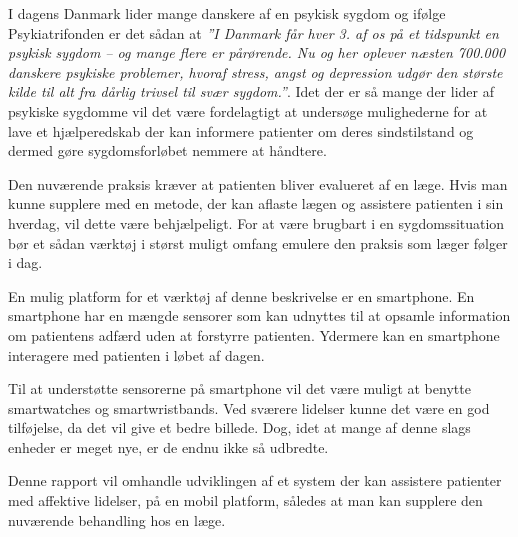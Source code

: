 


I dagens Danmark lider mange danskere af en psykisk sygdom og ifølge Psykiatrifonden er det sådan at \textit{''I Danmark får hver 3. af os på et tidspunkt en psykisk sygdom – og mange flere er pårørende. 
Nu og her oplever næsten 700.000 danskere psykiske problemer, hvoraf stress, angst og depression udgør den største kilde til alt fra dårlig trivsel til svær sygdom.''}\citep{psykiatrifonden}.
Idet der er så mange der lider af psykiske sygdomme vil det være fordelagtigt at undersøge mulighederne for at lave et hjælperedskab der kan informere patienter om deres sindstilstand og dermed gøre sygdomsforløbet nemmere at håndtere.

Den nuværende praksis kræver at patienten bliver evalueret af en læge.
Hvis man kunne supplere med en metode, der kan aflaste lægen og assistere patienten i sin hverdag, vil dette være behjælpeligt. 
For at være brugbart i en sygdomssituation bør et sådan værktøj i størst muligt omfang emulere den praksis som læger følger i dag.

En mulig platform for et værktøj af denne beskrivelse er en smartphone.
En smartphone har en mængde sensorer som kan udnyttes til at opsamle information om patientens adfærd uden at forstyrre patienten.
Ydermere kan en smartphone interagere med patienten i løbet af dagen. 

Til at understøtte sensorerne på smartphone vil det være muligt at benytte smartwatches og smartwristbands.
Ved sværere lidelser kunne det være en god tilføjelse, da det vil give et bedre billede.
Dog, idet at mange af denne slags enheder er meget nye, er de endnu ikke så udbredte.

Denne rapport vil omhandle udviklingen af et system der kan assistere patienter med affektive lidelser, på en mobil platform, således at man kan supplere den nuværende behandling hos en læge.